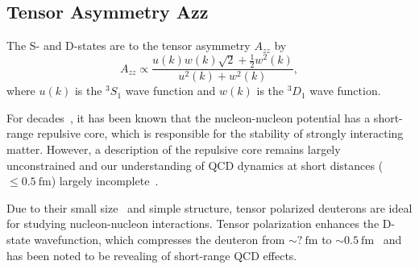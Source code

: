 \subsection{Tensor Asymmetry Azz}


The S- and D-states are to the tensor asymmetry $A_{zz}$ by~\cite{Frankfurt:1988nt}
\begin{equation}
	A_{zz} \propto \frac{u(k)w(k)\sqrt{2}+\frac{1}{2}w^2(k)}{u^2(k)+w^2(k)},
\end{equation}
where $u(k)$ is the $^3S_1$ wave function and $w(k)$ is the $^3D_1$ wave function.


For decades~\cite{PhysRev.81.165}, it has been known that the nucleon-nucleon potential has a short-range repulsive core, which is responsible for the stability of strongly interacting matter. However, a description of the repulsive core remains largely unconstrained and our understanding of QCD dynamics at short distances ($\leq 0.5\mathrm{~fm}$) largely incomplete~\cite{Sargsian:2014bwa}. 

Due to their small size~\cite{needed} and simple structure, tensor polarized deuterons are ideal for studying nucleon-nucleon interactions. Tensor polarization enhances the D-state wavefunction, which compresses the deuteron from $\sim?\mathrm{~fm}$ to $\sim0.5\mathrm{~fm}$~\cite{Forest:1996kp} and has been noted to be revealing of short-range QCD effects.
